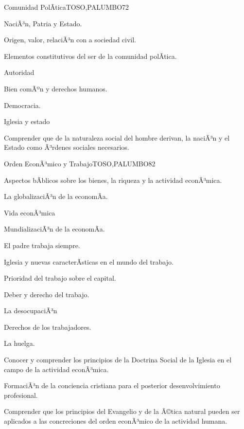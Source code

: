 \begin{syllabus}
\begin{unit}{Comunidad PolÃ­tica}{TOSO,PALUMBO}{7}{2}
\begin{topics}
	\item NaciÃ³n, Patria y Estado.
	\item Origen, valor, relaciÃ³n con a sociedad civil.
	\item Elementos constitutivos del ser de la comunidad polÃ­tica.
	\item Autoridad
	\item Bien comÃºn y derechos humanos.
	\item Democracia.
	\item Iglesia y estado
\end{topics}
\begin{unitgoals}
	\item Comprender que de la naturaleza social del hombre derivan, la naciÃ³n y el Estado como Ã³rdenes sociales necesarios.
\end{unitgoals}
\end{unit}

\begin{unit}{Orden EconÃ³mico y Trabajo}{TOSO,PALUMBO}{8}{2}
\begin{topics}
	\item Aspectos bÃ­blicos sobre los bienes, la riqueza y la actividad econÃ³mica.
	\item La globalizaciÃ³n de la economÃ­a.
	\item Vida econÃ³mica
	\item MundializaciÃ³n de la economÃ­a.
	\item El padre trabaja siempre.
	\item Iglesia y nuevas caracterÃ­sticas en el mundo del trabajo.
	\item Prioridad del trabajo sobre el capital.
	\item Deber y derecho del trabajo.
	\item La desocupaciÃ³n
	\item Derechos de los trabajadores.
	\item La huelga.
\end{topics}
\begin{unitgoals}
	\item Conocer y comprender los principios de la Doctrina Social de la Iglesia en el campo de la actividad econÃ³mica.
	\item FormaciÃ³n de la conciencia cristiana para el posterior desenvolvimiento profesional.
	\item Comprender que los principios del Evangelio y de la Ã©tica natural pueden ser aplicados a las concreciones del orden econÃ³mico de la actividad humana.
\end{unitgoals}
\end{unit}



\begin{coursebibliography}
\end{coursebibliography}

\end{syllabus}

